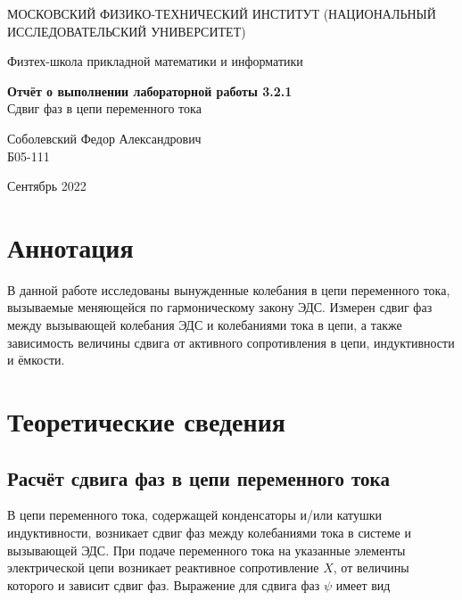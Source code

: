 \documentclass[a4paper,12pt]{article} %
\date{\today}
\begin{document}
\begin{titlepage}
	\begin{center}
		{\large МОСКОВСКИЙ ФИЗИКО-ТЕХНИЧЕСКИЙ ИНСТИТУТ (НАЦИОНАЛЬНЫЙ ИССЛЕДОВАТЕЛЬСКИЙ УНИВЕРСИТЕТ)}
	\end{center}
	\begin{center}
		{\large Физтех-школа прикладной математики и информатики}
	\end{center}
	
	
	\vspace{4.5cm}
	{\huge
		\begin{center}
			{\bf Отчёт о выполнении лабораторной работы 3.2.1}\\
			Сдвиг фаз в цепи переменного тока
		\end{center}
	}
	\vspace{1cm}
	\begin{center}
		{\large Соболевский Федор Александрович \\
			\vspace{0.2cm}
			Б05-111}
	\end{center}
	\vspace{8cm}
	\begin{center}
		Сентябрь 2022
	\end{center}
\end{titlepage}

\section{Аннотация}

В данной работе исследованы вынужденные колебания в цепи переменного тока, вызываемые меняющейся по гармоническому закону ЭДС. Измерен сдвиг фаз между вызывающей колебания ЭДС и колебаниями тока в цепи, а также зависимость величины сдвига от активного сопротивления в цепи, индуктивности и ёмкости. 

\section{Теоретические сведения}

\subsection{Расчёт сдвига фаз в цепи переменного тока}

В цепи переменного тока, содержащей конденсаторы и/или катушки индуктивности, возникает сдвиг фаз между колебаниями тока в системе и вызывающей ЭДС. При подаче переменного тока на указанные элементы электрической цепи возникает реактивное сопротивление $X$, от величины которого и зависит сдвиг фаз. Выражение для сдвига фаз $\psi$ имеет вид
\end{document}
